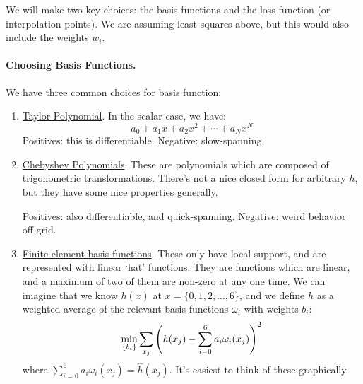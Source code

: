 \documentclass[10pt]{article}
\begin{document}
We will make two key choices: the basis functions and the loss function (or interpolation points). We are assuming least squares above, but this would also include the weights $w_i$. 

\paragraph{Choosing Basis Functions.} We have three common choices for basis function:
\begin{enumerate}
	\item \href{https://en.wikipedia.org/wiki/Taylor_series}{Taylor Polynomial}. In the scalar case, we have:
	\[
	a_0 + a_1x + a_2x^2 + \cdots + a_N x^N
	\]
	Positives: this is differentiable. Negative: slow-spanning.
	\item \href{https://en.wikipedia.org/wiki/Chebyshev_polynomials}{Chebyshev Polynomials}. These are polynomials which are composed of trigonometric transformations. There's not a nice closed form for arbitrary $h$, but they have some nice properties generally.

	
	Positives: also differentiable, and quick-spanning. Negative: weird behavior off-grid.
	\item \href{https://www.geophysik.uni-muenchen.de/~igel/Lectures/NMG/08_finite_elements_basisfunctions.pdf}{Finite element basis functions}. These only have local support, and are represented with linear `hat' functions. They are functions which are linear, and a maximum of two of them are non-zero at any one time. We can imagine that we know $h(x)$ at $x = \{0,1,2,\dots,6\}$, and we define $h$ as a weighted average of the relevant basis functions $\omega_i$ with weights $b_i$:
	\[
	\min_{\{b_i\}} \sum_{x_j} \left( h(x_j) - \sum_{i=0}^6 a_i \omega_i(x_j)\right)^2
	\]
	where $\sum_{i=0}^6 a_i \omega_i(x_j) = \hat{h}(x_j)$. It's easiest to think of these graphically.
	\begin{figure}[H]
		\centering
\end{figure}
\end{enumerate}
\end{document}
